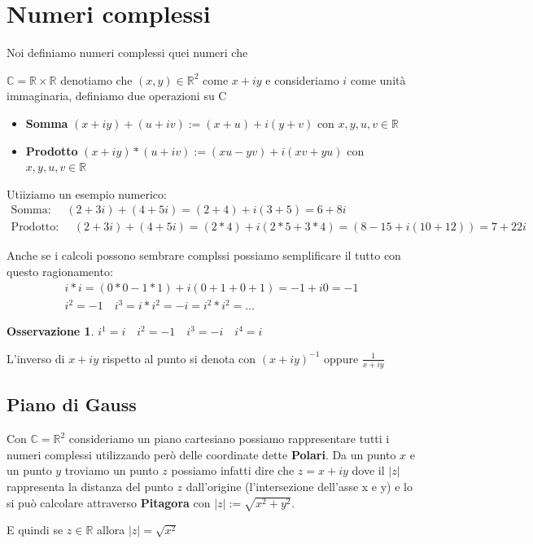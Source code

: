 \documentclass{article}
\theoremstyle{definition}
\newtheorem{oss}{Osservazione}[section]
\begin{document}
\newpage
\section{Numeri complessi}\label{sec:numeri_complessi}
Noi definiamo numeri complessi quei numeri che


$\mathbb{C} = \mathbb{R} \times \mathbb{R}$ denotiamo che $(x,y) \in \mathbb{R}^2$ come $x + iy$ e consideriamo $i$ come unità immaginaria, definiamo due operazioni su C
\begin{itemize}
        \item \textbf{Somma} $(x + iy) + (u + iv) := (x+u) + i(y+v)$ con $x,y,u,v \in \mathbb{R}$
        \item \textbf{Prodotto} $(x + iy) * (u + iv) := (xu - yv) + i(xv+yu)$ con $x,y,u,v \in \mathbb{R}$
\end{itemize}

Utiiziamo un esempio numerico:
\begin{align}
        \textrm{Somma: } \quad (2 + 3i) + (4 + 5i) = (2 + 4) + i(3 + 5) = 6 + 8i \\
        \textrm{Prodotto: } \quad (2 + 3i) + (4 + 5i) = (2 * 4) + i(2*5 + 3*4) = (8-15 + i(10+12)) = 7 + 22i
\end{align}

Anche se i calcoli possono sembrare complssi possiamo semplificare il tutto con questo ragionamento:
\begin{align*}
        i * i = (0*0 - 1*1) + i(0+1 + 0+1) = -1+ i0 = -1 \\
        i^2 = -1 \quad i^3 = i * i^2 = -i = i^2 * i^2 = \ldots 
\end{align*}

\begin{tcolorbox}
\begin{oss}
        $\boxed{ i^1 = i \quad i^2 = -1 \quad i^3 = -i \quad i^4 = i}$
\end{oss}
\end{tcolorbox}

L'inverso di $x + iy$ rispetto al punto si denota con ${(x + iy)}^{-1}$ oppure $\frac{1}{x + iy}$



\subsection{Piano di Gauss}
Con $\mathbb{C} = \mathbb{R}^2$ consideriamo un piano cartesiano possiamo rappresentare tutti i numeri complessi utilizzando però delle coordinate dette \textbf{Polari}.
Da un punto $x$ e un punto $y$ troviamo un punto $z$ possiamo infatti dire che $z = x+iy$ dove il $|z|$  rappresenta la distanza del punto $z$ dall'origine (l'intersezione dell'asse x e y) e lo si può calcolare attraverso \textbf{Pitagora} con $|z| := \sqrt{x^2+y^2}$. \par
E quindi se $z \in \mathbb{R}$ allora $|z| = \sqrt{x^2}$
\end{document}
